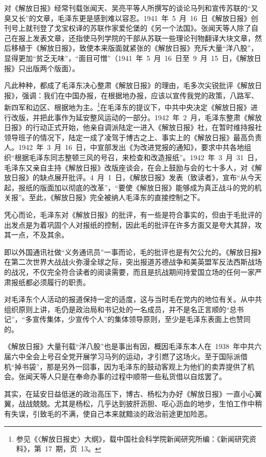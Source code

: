 对《解放日报》经常刊载张闻天、吴亮平等人所撰写的谈论马列和宣传苏联的“又臭又长”的文章，毛泽东更是感到难以容忍。1941~年~5~月~16~日《解放日报》创刊号上就刊登了戈宝权译的苏联作家爱伦堡的《另一个法国》。张闻天等人除了自己在报上发表文章，还指使马列学院的干部从苏联一些理论刊物翻译大块文章，然后移植于《解放日报》，致使本来版面就紧张的《解放日报》充斥大量“洋八股”，显得更加“贫乏无味”，“面目可憎”（1941~年~5~月~16~日至~9~月~15~日，《解放日报》只出版两个版面）。

凡此种种，都成了毛泽东决心整肃《解放日报》的理由，毛多次尖锐批评《解放日报》，强调：我们在中国办报，在根据地办报，应该以宣传我党的政策，八路军、新四军和边区、根据地为主。\footnote{参见《〈解放日报史〉大纲》，载中国社会科学院新闻研究所编：《新闻研究资料》，第~17~期，页~13。}在毛泽东的提议下，中共中央决定《解放日报》进行改版，并把此事作为延安整风运动的一部分。1942~年~2~月，毛泽东整肃《解放日报》的行动正式开始，他亲自调派陆定一进入《解放日报》社，在暂时维持报社领导班子的情况下，陆定一成了凌驾于博古之上、事实上的《解放日报》最高负责人。1942~年~3~月~16~日，中宣部发出《为改进党报的通知》，要求中共各地组织“根据毛泽东同志整顿三风的号召，来检查和改造报纸”。1942~年~3~月~31~日，毛泽东又亲自主持《解放日报》改版座谈会，在会上鼓励与会的七十多人，对《解放日报》的缺点展开批评。4~月~1~日，《解放日报》发表（致读者》，宣布“从今天起，报纸的版面加以彻底的改革”，“要使《解放日报》能够成为真正战斗的党的机关报”。至此，《解放日报》完全被纳人毛泽东的直接控制之下。

凭心而论，毛泽东对《解放日报》的批评，有一些是符合事实的，但由于毛批评的出发点是为着巩固个人对报纸的控制，因此毛的批评在许多方面又是夸大其辞，攻其一点，不及其余。

即以外国通讯社做“义务通讯员”一事而论，毛的批评也是有欠公允的。《解放日报》在第二次世界大战战火弥漫全球之际，突出报道苏德战争和美英盟军反法西斯战场的战况，不仅完全符合读者的阅读需要，而且是抗战期间持爱国立场的任何一家严肃报纸都必须履行的职责。

对毛泽东个人活动的报道保持一定的适度，这与当时毛在党内的地位有关。从中共组织原则上讲，毛仍是政治局和书记处的一名成员，并不是名正言顺的“总书记”，“多宣传集体，少宣传个人”的集体领导原则，至少是毛泽东表面上也赞同的。

《解放日报》大量刊载“洋八股”也是事出有因，概因毛泽东本人在~1938~年中共六届六中全会上号召全党开展学习马列的运动，才引燃了这场火。至于国际派借机“掉书袋”，那是另外一回事，因为毛泽东的鼓动客观上为他们的卖弄提供了机会。张闻天等人只是在奉命办事的过程中顺带一些私货借以自炫罢了。

其实，在延安日益低迷的政治高压下，博古、杨松为办好《解放日报》一直小心翼翼，战战兢兢。尤其是杨松，几乎达到披肝沥胆、呕心沥血的地步，生怕工作中稍有失误，引致毛的不满，使自己本来就黯淡的政治前途更加险恶。

